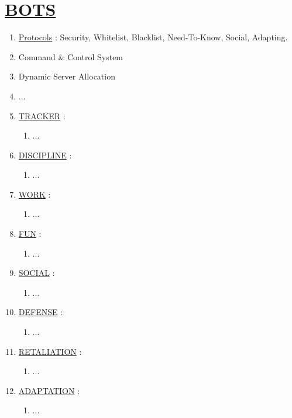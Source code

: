 \documentclass[11pt]{article}
\begin{document}
\section*{\ul{BOTS}}
\begin{enumerate}
	\item[] \ul{Protocols} : Security, Whitelist, Blacklist, Need-To-Know, Social, Adapting.
	
	\item[] Command \& Control System
	\item[] Dynamic Server Allocation
	\item[] ...
	
	\item[] \ul{TRACKER} :
	\begin{enumerate}
		\item[] ...
	\end{enumerate}

	\item[] \ul{DISCIPLINE} :
	\begin{enumerate}
		\item[] ...
	\end{enumerate}

	\item[] \ul{WORK} :
	\begin{enumerate}
		\item[] ...
	\end{enumerate}

	\item[] \ul{FUN} :
	\begin{enumerate}
		\item[] ...
	\end{enumerate}

	\item[] \ul{SOCIAL} :
	\begin{enumerate}
		\item[] ...
	\end{enumerate}

	\item[] \ul{DEFENSE} :
	\begin{enumerate}
		\item[] ...
	\end{enumerate}

	\item[] \ul{RETALIATION} :
	\begin{enumerate}
		\item[] ...
	\end{enumerate}

	\item[] \ul{ADAPTATION} :
	\begin{enumerate}
		\item[] ...
	\end{enumerate}
\end{enumerate}
\end{document}
